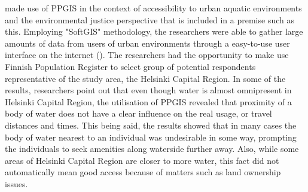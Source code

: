  made use of PPGIS in the context of accessibility to urban aquatic environments and the environmental justice perspective that is included in a premise such as this. Employing "SoftGIS" methodology, the researchers were able to gather large amounts of data from users of urban environments through a easy-to-use user interface on the internet (\cite{Kytta2011}). The researchers had the opportunity to make use Finnish Population Register to select group of potential respondents representative of the study area, the Helsinki Capital Region. In some of the results, researchers point out that even though water is almost omnipresent in Helsinki Capital Region, the utilisation of PPGIS revealed that proximity of a body of water does not have a clear influence on the real usage, or travel distances and times. This being said, the results showed that in many cases the body of water nearest to an individual was undesirable in some way, prompting the individuals to seek amenities along waterside further away. Also, while some areas of Helsinki Capital Region are closer to more water, this fact did not automatically mean good access because of matters such as land ownership issues.